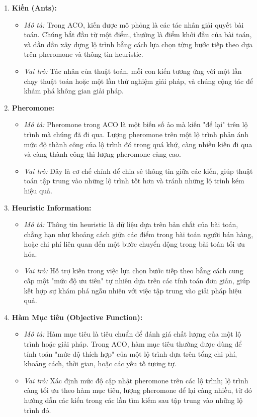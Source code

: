 \documentclass[14pt]{article}
\begin{document}
	\begin{enumerate}
	\item \textbf{Kiến (Ants):}
	\begin{itemize}
		\item \textit{Mô tả:} Trong ACO, kiến được mô phỏng là các tác nhân giải quyết bài toán. Chúng bắt đầu từ một điểm, thường là điểm khởi đầu của bài toán, và dần dần xây dựng lộ trình bằng cách lựa chọn từng bước tiếp theo dựa trên pheromone và thông tin heuristic.
		\item \textit{Vai trò:} Tác nhân của thuật toán, mỗi con kiến tương ứng với một lần chạy thuật toán hoặc một lần thử nghiệm giải pháp, và chúng cộng tác để khám phá không gian giải pháp.
	\end{itemize}
	
	\item \textbf{Pheromone:}
	\begin{itemize}
		\item \textit{Mô tả:} Pheromone trong ACO là một biến số ảo mà kiến "để lại" trên lộ trình mà chúng đã đi qua. Lượng pheromone trên một lộ trình phản ánh mức độ thành công của lộ trình đó trong quá khứ, càng nhiều kiến đi qua và càng thành công thì lượng pheromone càng cao.
		\item \textit{Vai trò:} Đây là cơ chế chính để chia sẻ thông tin giữa các kiến, giúp thuật toán tập trung vào những lộ trình tốt hơn và tránh những lộ trình kém hiệu quả.
	\end{itemize}
	
	\item \textbf{Heuristic Information:}
	\begin{itemize}
		\item \textit{Mô tả:} Thông tin heuristic là dữ liệu dựa trên bản chất của bài toán, chẳng hạn như khoảng cách giữa các điểm trong bài toán người bán hàng, hoặc chi phí liên quan đến một bước chuyển động trong bài toán tối ưu hóa.
		\item \textit{Vai trò:} Hỗ trợ kiến trong việc lựa chọn bước tiếp theo bằng cách cung cấp một "mức độ ưu tiên" tự nhiên dựa trên các tính toán đơn giản, giúp kết hợp sự khám phá ngẫu nhiên với việc tập trung vào giải pháp hiệu quả.
	\end{itemize}
	
	\item \textbf{Hàm Mục tiêu (Objective Function):}
	\begin{itemize}
		\item \textit{Mô tả:} Hàm mục tiêu là tiêu chuẩn để đánh giá chất lượng của một lộ trình hoặc giải pháp. Trong ACO, hàm mục tiêu thường được dùng để tính toán "mức độ thích hợp" của một lộ trình dựa trên tổng chi phí, khoảng cách, thời gian, hoặc các yếu tố tương tự.
		\item \textit{Vai trò:} Xác định mức độ cập nhật pheromone trên các lộ trình; lộ trình càng tối ưu theo hàm mục tiêu, lượng pheromone để lại càng nhiều, từ đó hướng dẫn các kiến trong các lần tìm kiếm sau tập trung vào những lộ trình đó.
	\end{itemize}
	\end{enumerate}
\end{document}
